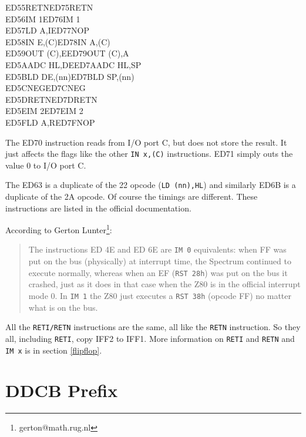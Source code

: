 \documentclass[oneside,a4paper]{book}
\begin{document}
{\begin{tabbing}
{\qquad}ED55\>RETN{\footnotemark[7]}\>ED75\>RETN{\footnotemark[7]}\\
{\qquad}ED56\>IM 1\>ED76\>IM 1{\footnotemark[7]}\\
{\qquad}ED57\>LD A,I\>ED77\>NOP{\footnotemark[7]}\\
{\qquad}ED58\>IN E,(C)\>ED78\>IN A,(C)\\
{\qquad}ED59\>OUT (C),E\>ED79\>OUT (C),A\\
{\qquad}ED5A\>ADC HL,DE\>ED7A\>ADC HL,SP\\
{\qquad}ED5B\>LD DE,(nn)\>ED7B\>LD SP,(nn)\\
{\qquad}ED5C\>NEG{\footnotemark[7]}\>ED7C\>NEG{\footnotemark[7]}\\
{\qquad}ED5D\>RETN{\footnotemark[7]}\>ED7D\>RETN{\footnotemark[7]}\\
{\qquad}ED5E\>IM 2\>ED7E\>IM 2{\footnotemark[7]}\\
{\qquad}ED5F\>LD A,R\>ED7F\>NOP{\footnotemark[7]}\\
\end{tabbing}
}
\renewcommand{\thefootnote}{\arabic{footnote}}

The ED70 instruction reads from I/O port C, but does not store the result. 
It just affects the flags like the other {\tt IN x,(C)} instructions. 
ED71 simply outs the value 0 to I/O port C.

The ED63 is a duplicate of the 22 opcode ({\tt LD (nn),HL}) and similarly
ED6B is a duplicate of the 2A opcode. Of course the timings are
different. These instructions are listed in the official documentation.

According to Gerton Lunter\footnote{gerton@math.rug.nl}:

\begin{quote}
  The instructions ED 4E and ED 6E are {\tt IM 0} equivalents: when FF was put
  on the bus (physically) at interrupt time, the Spectrum continued to
  execute normally, whereas when an EF ({\tt RST 28h}) was put on the bus it
  crashed, just as it does in that case when the Z80 is in the official
  interrupt mode 0.  In {\tt IM 1} the Z80 just executes a {\tt RST 38h} 
  (opcode FF) no matter what is on the bus.
\end{quote}

All the {\tt RETI/RETN} instructions are the same, all like the {\tt RETN}
instruction. So they all, including {\tt RETI}, copy IFF2 to IFF1. More 
information on {\tt RETI} and {\tt RETN} and {\tt IM x} is in 
section \ref{flipflop}.

\section{DDCB Prefix}
\label{prefix_cbdd}
\end{document}
